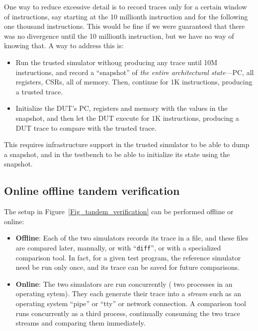 One way to reduce excessive detail is to record traces only for a
certain window of instructions, say starting at the 10 millionth
instruction and for the following one thousand instructions.  This
would be fine if we were guaranteed that there was no divergence until
the 10 millionth instruction, but we have no way of knowing that.  A
way to address this is:

\begin{itemize}

 \item Run the trusted simulator withoug producing any trace until 10M
       instructions, and record a ``snapshot'' of \emph{the entire
       architectural state}---PC, all registers, CSRs, all of memory.
       Then, continue for 1K instructions, producing a trusted trace.

 \item Initialize the DUT's PC, registers and memory with the values
       in the snapshot, and then let the DUT execute for 1K
       instructions, producing a DUT trace to compare with the trusted
       trace.

\end{itemize}

This requires infrastructure support in the trusted simulator to be
able to dump a snapshot, and in the testbench to be able to initialize
its state using the snapshot.


\subsection{Online {\vs} offline tandem verification}

The setup in Figure~\ref{Fig_tandem_verification} can be performed
offline or online:

\begin{itemize}

 \item {\bf Offline}: Each of the two simulators records its trace in
       a file, and these files are compared later, manually, or with
       ``{\tt diff}'', or with a specialized comparison tool.  In
       fact, for a given test program, the reference simulator need be
       run only once, and its trace can be saved for future
       comparisons.

 \item {\bf Online}: The two simulators are run concurrently ({\eg}
       two processes in an operating sytem).  They each generate their
       trace into a \emph{stream} such as an operating system ``pipe''
       or ``tty'' or network connection.  A comparison tool runs
       concurrently as a third process, continually consuming the two
       trace streams and comparing them immediately.

\end{itemize}


